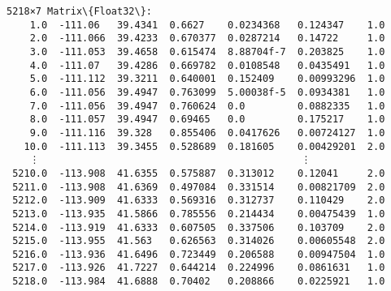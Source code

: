 \documentclass[11pt]{article}
\begin{document}
    
    \begin{Verbatim}[commandchars=\\\{\}]
5218×7 Matrix\{Float32\}:
    1.0  -111.06   39.4341  0.6627    0.0234368   0.124347    1.0
    2.0  -111.066  39.4233  0.670377  0.0287214   0.14722     1.0
    3.0  -111.053  39.4658  0.615474  8.88704f-7  0.203825    1.0
    4.0  -111.07   39.4286  0.669782  0.0108548   0.0435491   1.0
    5.0  -111.112  39.3211  0.640001  0.152409    0.00993296  1.0
    6.0  -111.056  39.4947  0.763099  5.00038f-5  0.0934381   1.0
    7.0  -111.056  39.4947  0.760624  0.0         0.0882335   1.0
    8.0  -111.057  39.4947  0.69465   0.0         0.175217    1.0
    9.0  -111.116  39.328   0.855406  0.0417626   0.00724127  1.0
   10.0  -111.113  39.3455  0.528689  0.181605    0.00429201  2.0
    ⋮                                             ⋮           
 5210.0  -113.908  41.6355  0.575887  0.313012    0.12041     2.0
 5211.0  -113.908  41.6369  0.497084  0.331514    0.00821709  2.0
 5212.0  -113.909  41.6333  0.569316  0.312737    0.110429    2.0
 5213.0  -113.935  41.5866  0.785556  0.214434    0.00475439  1.0
 5214.0  -113.919  41.6333  0.607505  0.337506    0.103709    2.0
 5215.0  -113.955  41.563   0.626563  0.314026    0.00605548  2.0
 5216.0  -113.936  41.6496  0.723449  0.206588    0.00947504  1.0
 5217.0  -113.926  41.7227  0.644214  0.224996    0.0861631   1.0
 5218.0  -113.984  41.6888  0.70402   0.208866    0.0225921   1.0
    \end{Verbatim}
\end{document}

